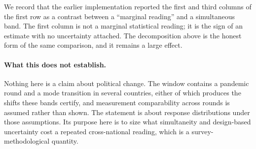 We record that the earlier implementation reported the first and third columns
of the first row as a contrast between a ``marginal reading'' and a
simultaneous band. The first column is not a marginal statistical reading; it is
the sign of an estimate with no uncertainty attached. The decomposition above is
the honest form of the same comparison, and it remains a large effect.

\paragraph{What this does not establish.} Nothing here is a claim about
political change. The window contains a pandemic round and a mode transition in
several countries, either of which produces the shifts these bands certify, and
measurement comparability across rounds is assumed rather than shown. The
statement is about response distributions under those assumptions. Its purpose
here is to size what simultaneity and design-based uncertainty cost a repeated
cross-national reading, which is a survey-methodological quantity.
